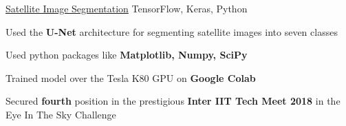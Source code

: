 

\begin{cventries}


  \projects
    {} %
    {\href{}{Satellite Image Segmentation}} %
    {TensorFlow, Keras, Python} %
    {} %
    {
      \begin{cvitems} %
        \item {Used the \textbf{U-Net} architecture for segmenting satellite images into seven classes}
        \item {Used python packages like \textbf{Matplotlib, Numpy, SciPy}}
        \item {Trained model over the Tesla K80 GPU on \textbf{Google Colab}}
        \item {Secured \textbf{fourth} position in the prestigious \textbf{Inter IIT Tech Meet 2018} in the Eye In The Sky Challenge}
      \end{cvitems}
    }


\end{cventries}
